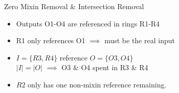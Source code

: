 




\begin{frame}{Zero Mixin Removal \& Intersection Removal}
	\resizebox{\textwidth}{!}{}
	\begin{itemize}
		\item Outputs O1-O4 are referenced in rings R1-R4
		\item<2-> R1 only references O1 $\implies$ must be the real input
		\item<3-> $I = \{R3,R4\}$ reference $O=\{O3,O4\}$  \\
		\qquad	$|I| = |O|$ $\implies$ O3 \& O4 spent in R3 \& R4
		\item<4-> $R2$ only has one non-mixin reference remaining.
	\end{itemize}
\end{frame}


